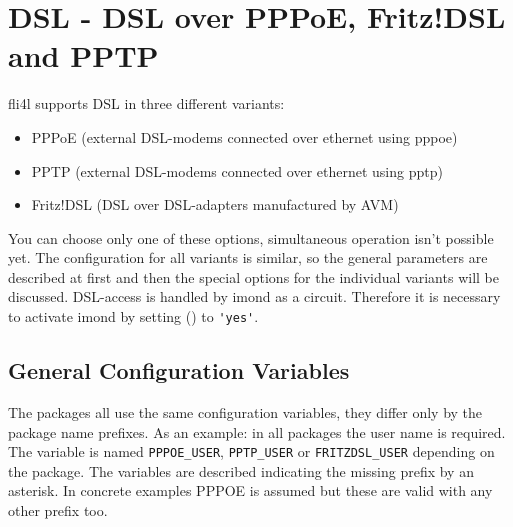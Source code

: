 \section{DSL - DSL over PPPoE, Fritz!DSL and PPTP}

fli4l supports DSL in three different variants:

\begin{itemize}
\item PPPoE (external DSL-modems connected over ethernet using pppoe)
\item PPTP (external DSL-modems connected over ethernet using pptp)
\item Fritz!DSL (DSL over DSL-adapters manufactured by AVM)
\end{itemize}

You can choose only one of these options, simultaneous operation 
isn't possible yet.
The configuration for all variants is similar, so the
general parameters are described at first and then the
special options for the individual variants will be discussed. 
DSL-access is handled by imond as a circuit. Therefore 
it is necessary to activate imond by setting 
()
to \verb*?'yes'?.

\subsection {General Configuration Variables}

The packages all use the same configuration variables, they
differ only by the package name prefixes. As an example: 
in all packages the user name is required. The variable is named 
\verb*?PPPOE_USER?, \verb*?PPTP_USER? or \verb*?FRITZDSL_USER? 
depending on the package. The variables are described indicating
the missing prefix by an asterisk. In concrete examples PPPOE is 
assumed but these are valid with any other prefix too.

